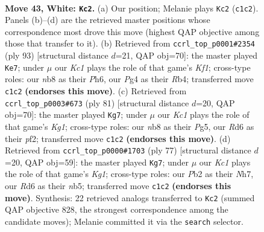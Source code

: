 \documentclass[11pt]{article}
\begin{document}
\clearpage

\begin{figure}[p]\centering
\begin{subfigure}{0.46\textwidth}\centering
\resizebox{\linewidth}{!}{%
\newchessgame
\chessboard[
  setfen={1n3k2/8/1p1R4/1P1P4/p1p3P1/8/1P6/2K4r w - - 1 43},
  showmover=false,
  pgfstyle=straightmove, color=movearrow, markmove={c1-c2}
]}
\caption{}
\end{subfigure}\hfill
\begin{subfigure}{0.46\textwidth}\centering
\resizebox{\linewidth}{!}{%
\newchessgame
\chessboard[
  setfen={R4k2/5pp1/7p/3pPP2/1r4P1/8/4K3/8 b - - 11 47},
  showmover=false,
  pgfstyle=straightmove, color=movearrow, markmove={f8-e7}
]}
\caption{}
\end{subfigure}
\\[4pt]
\begin{subfigure}{0.46\textwidth}\centering
\resizebox{\linewidth}{!}{%
\newchessgame
\chessboard[
  setfen={1R4k1/5p2/1p5p/6p1/P7/2K3PP/5P2/r7 b - - 5 41},
  showmover=false,
  pgfstyle=straightmove, color=movearrow, markmove={g8-g7}
]}
\caption{}
\end{subfigure}\hfill
\begin{subfigure}{0.46\textwidth}\centering
\resizebox{\linewidth}{!}{%
\newchessgame
\chessboard[
  setfen={R5k1/7n/6p1/1N5p/1Pp5/5PP1/7r/4K3 b - - 1 39},
  showmover=false,
  pgfstyle=straightmove, color=movearrow, markmove={g8-g7}
]}
\caption{}
\end{subfigure}
\caption{\textbf{Move 43, White: \texttt{Kc2}.} (a) Our position; Melanie plays \texttt{Kc2} (\texttt{c1c2}). Panels (b)--(d) are the retrieved master positions whose correspondence most drove this move (highest QAP objective among those that transfer to it). (b) Retrieved from \texttt{ccrl\_top\_p0001\#2354} (ply 93) [structural distance $d$=21, QAP obj=70]: the master played \texttt{Ke7}; under $\mu$ our \emph{Kc1} plays the role of that game's \emph{Kf1}; cross-type roles: our \emph{n}b8 as their \emph{P}h6, our \emph{P}g4 as their \emph{R}b4; transferred move \texttt{c1c2} \textbf{(endorses this move)}. (c) Retrieved from \texttt{ccrl\_top\_p0003\#673} (ply 81) [structural distance $d$=20, QAP obj=70]: the master played \texttt{Kg7}; under $\mu$ our \emph{Kc1} plays the role of that game's \emph{Kg1}; cross-type roles: our \emph{n}b8 as their \emph{P}g5, our \emph{R}d6 as their \emph{p}f2; transferred move \texttt{c1c2} \textbf{(endorses this move)}. (d) Retrieved from \texttt{ccrl\_top\_p0000\#1703} (ply 77) [structural distance $d$=20, QAP obj=59]: the master played \texttt{Kg7}; under $\mu$ our \emph{Kc1} plays the role of that game's \emph{Kg1}; cross-type roles: our \emph{P}b2 as their \emph{N}h7, our \emph{R}d6 as their \emph{n}b5; transferred move \texttt{c1c2} \textbf{(endorses this move)}. Synthesis: 22 retrieved analogs transferred to \texttt{Kc2} (summed QAP objective 828, the strongest correspondence among the candidate moves); Melanie committed it via the \texttt{search} selector.}
\label{fig:thought-m84}
\end{figure}
\end{document}
